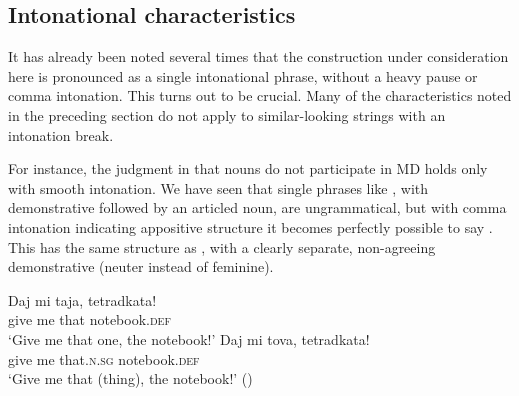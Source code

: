 \documentclass[output=paper]{langscibook}
\begin{document}
\subsection{Intonational characteristics} \label{sec:rudin:intonation}

It has already been noted several times that the construction under consideration here is pronounced as a single intonational phrase, without a heavy pause or comma intonation. This turns out to be crucial. Many of the characteristics noted in the preceding section do not apply to similar-looking strings with an intonation break.

For instance, the judgment in  that nouns do not participate in MD holds only with smooth intonation. We have seen that single phrases like , with demonstrative followed by an articled noun, are ungrammatical, but with comma intonation indicating appositive structure it becomes perfectly possible to say . This has the same structure as , with a clearly separate, non-agreeing demonstrative (neuter instead of feminine).



\ex
\ea \label{notebook2}
\gll Daj mi taja, tetradkata! \\
    give me that notebook.\textsc{def} \\
\glt `Give me that one, the notebook!'
\ex \label{notebook3}
\gll Daj mi tova, tetradkata! \\
    give me that.\textsc{n.sg} notebook.\textsc{def} \\
\glt `Give me that (thing), the notebook!' \hfill ()
\z
\z
\end{document}
